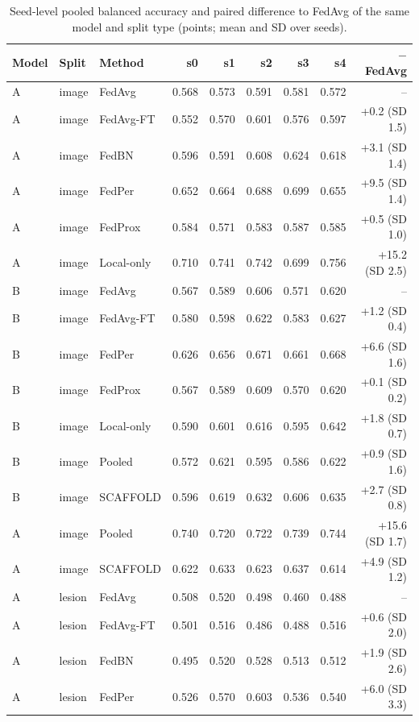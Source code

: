 \documentclass[10pt]{article}
\begin{document}
\begin{table}[!htbp]
\centering
\scriptsize
\caption{Seed-level pooled balanced accuracy and paired difference to FedAvg of the same model and split type (points; mean and SD over seeds).}
\label{tab:s10seed}
\begin{tabular}{@{}lllrrrrrr@{}}
\toprule
Model & Split & Method & s0 & s1 & s2 & s3 & s4 & $-$FedAvg \\
\midrule
A & image & FedAvg & 0.568 & 0.573 & 0.591 & 0.581 & 0.572 & -- \\
A & image & FedAvg-FT & 0.552 & 0.570 & 0.601 & 0.576 & 0.597 & +0.2 (SD 1.5) \\
A & image & FedBN & 0.596 & 0.591 & 0.608 & 0.624 & 0.618 & +3.1 (SD 1.4) \\
A & image & FedPer & 0.652 & 0.664 & 0.688 & 0.699 & 0.655 & +9.5 (SD 1.4) \\
A & image & FedProx & 0.584 & 0.571 & 0.583 & 0.587 & 0.585 & +0.5 (SD 1.0) \\
A & image & Local-only & 0.710 & 0.741 & 0.742 & 0.699 & 0.756 & +15.2 (SD 2.5) \\
B & image & FedAvg & 0.567 & 0.589 & 0.606 & 0.571 & 0.620 & -- \\
B & image & FedAvg-FT & 0.580 & 0.598 & 0.622 & 0.583 & 0.627 & +1.2 (SD 0.4) \\
B & image & FedPer & 0.626 & 0.656 & 0.671 & 0.661 & 0.668 & +6.6 (SD 1.6) \\
B & image & FedProx & 0.567 & 0.589 & 0.609 & 0.570 & 0.620 & +0.1 (SD 0.2) \\
B & image & Local-only & 0.590 & 0.601 & 0.616 & 0.595 & 0.642 & +1.8 (SD 0.7) \\
B & image & Pooled & 0.572 & 0.621 & 0.595 & 0.586 & 0.622 & +0.9 (SD 1.6) \\
B & image & SCAFFOLD & 0.596 & 0.619 & 0.632 & 0.606 & 0.635 & +2.7 (SD 0.8) \\
A & image & Pooled & 0.740 & 0.720 & 0.722 & 0.739 & 0.744 & +15.6 (SD 1.7) \\
A & image & SCAFFOLD & 0.622 & 0.633 & 0.623 & 0.637 & 0.614 & +4.9 (SD 1.2) \\
A & lesion & FedAvg & 0.508 & 0.520 & 0.498 & 0.460 & 0.488 & -- \\
A & lesion & FedAvg-FT & 0.501 & 0.516 & 0.486 & 0.488 & 0.516 & +0.6 (SD 2.0) \\
A & lesion & FedBN & 0.495 & 0.520 & 0.528 & 0.513 & 0.512 & +1.9 (SD 2.6) \\
A & lesion & FedPer & 0.526 & 0.570 & 0.603 & 0.536 & 0.540 & +6.0 (SD 3.3) \\

\end{tabular}
\end{table}
\end{document}
